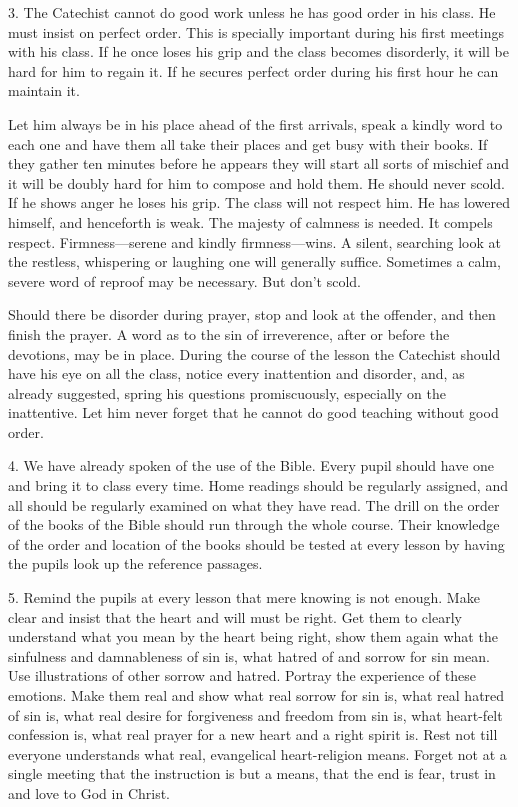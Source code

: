  3. The Catechist cannot do good work unless he has good order in his class. He must insist on perfect order. This is specially important during his first meetings with his class. If he once loses his grip and the class becomes disorderly, it will be hard for him to regain it. If he secures perfect order during his first hour he can maintain it.

Let him always be in his place ahead of the first
arrivals, speak a kindly word to each one and have them all take their places and get busy with their books. If they gather ten minutes before he appears they will start all sorts of mischief and it will be doubly hard for him to compose and hold them. He should never scold. If he shows anger he loses his grip. The class will not respect him. He has lowered himself, and henceforth is weak. The majesty of calmness is needed. It compels respect. Firmness—serene and kindly firmness—wins. A silent, searching look at the restless, whispering or laughing one will generally suffice. Sometimes a calm, severe word of reproof may be necessary. But don’t scold.

Should there be disorder during prayer, stop and look at the offender, and then finish the prayer. A word as to the sin of irreverence, after or before the devotions, may be in place. During the course of the lesson the Catechist should have his eye on all the class, notice every inattention and disorder, and, as already suggested, spring his questions promiscuously, especially on the inattentive. Let him never forget that he cannot do good teaching without good order.

 4. We have already spoken of the use of the Bible. Every pupil should have one and bring it to class every time. Home readings should be regularly assigned, and all should be regularly examined
on what they have read. The drill on the order of the books of the Bible should run through the whole course. Their knowledge of the order and location of the books should be tested at every lesson by having the pupils look up the reference passages.

 5. Remind the pupils at every lesson that mere knowing is not enough. Make clear and insist that the heart and will must be right. Get them to clearly understand what you mean by the heart being right, show them again what the sinfulness and damnableness of sin is, what hatred of and sorrow for sin mean. Use illustrations of other sorrow and hatred. Portray the experience of these emotions. Make them real and show what real sorrow for sin is, what real hatred of sin is, what real desire for forgiveness and freedom from sin is, what heart-felt confession is, what real prayer for a new heart and a right spirit is. Rest not till everyone understands what real, evangelical heart-religion means. Forget not at a single meeting that the instruction is but a means, that the end is fear, trust in and love to God in Christ.


